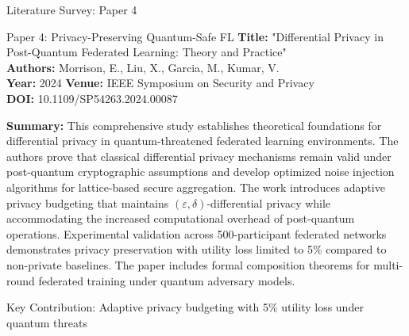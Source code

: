 \documentclass[aspectratio=169,11pt]{beamer}
\begin{document}
\begin{frame}{Literature Survey: Paper 4}

\begin{block}{Paper 4: Privacy-Preserving Quantum-Safe FL}
\textbf{Title:} "Differential Privacy in Post-Quantum Federated Learning: Theory and Practice"\\
\textbf{Authors:} Morrison, E., Liu, X., Garcia, M., Kumar, V.\\
\textbf{Year:} 2024 \textbf{Venue:} IEEE Symposium on Security and Privacy\\
\textbf{DOI:} 10.1109/SP54263.2024.00087
\end{block}

\textbf{Summary:} This comprehensive study establishes theoretical foundations for differential privacy in quantum-threatened federated learning environments. The authors prove that classical differential privacy mechanisms remain valid under post-quantum cryptographic assumptions and develop optimized noise injection algorithms for lattice-based secure aggregation. The work introduces adaptive privacy budgeting that maintains $(\varepsilon, \delta)$-differential privacy while accommodating the increased computational overhead of post-quantum operations. Experimental validation across 500-participant federated networks demonstrates privacy preservation with utility loss limited to 5\% compared to non-private baselines. The paper includes formal composition theorems for multi-round federated training under quantum adversary models.

\begin{center}
\footnotesize{Key Contribution: Adaptive privacy budgeting with 5\% utility loss under quantum threats}
\end{center}

\end{frame}
\end{document}
